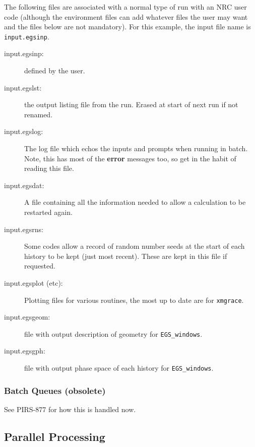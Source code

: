 The following files are associated with a normal type of run with an NRC
user code (although the environment files can add whatever files the user 
may want and the files below are not mandatory).  For
this example, the input file name is \verb+input.egsinp+.
\begin{description}
\item [input.egsinp:] defined by the user.
\item [input.egslst:]  the output listing file from the run. Erased
at start of next run if not renamed.
\item [input.egslog:] The log file which echos the inputs and
prompts when running in batch. Note, this has most of the {\bf error}
messages too, so get in the habit of reading this file.
\item [input.egsdat:] A file containing all the information needed to
allow a calculation to be restarted again.
\item [input.egsrns:] Some codes allow a record of random number seeds
at the start of each history to be kept (just most recent). These are
kept in this file if requested.
\item [input.egsplot (etc):] Plotting files for various routines, the
most up to date are for \verb+xmgrace+.
\item [input.egsgeom:] file with output description of geometry for
\verb+EGS_windows+.
\item [input.egsgph:] file with output phase space of each history for
\verb+EGS_windows+.
\end{description}


\subsubsection{Batch Queues (obsolete)}
\label{batch_que}
See PIRS-877 for how this is handled now.


\subsection{Parallel Processing}
\label{pprocess}

